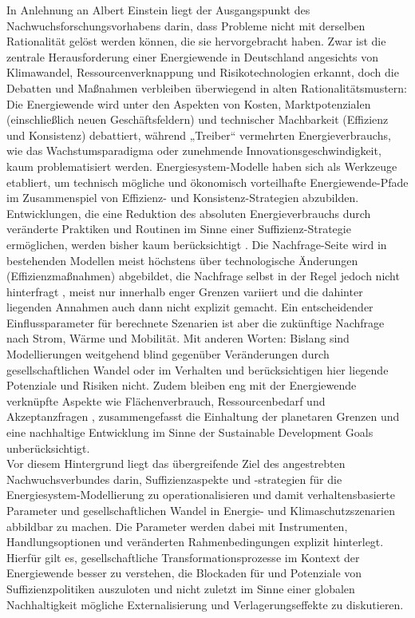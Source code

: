 \documentclass[a4paper,11pt,twoside]{scrartcl}
\begin{document}
In Anlehnung an Albert Einstein liegt der Ausgangspunkt des Nachwuchsforschungsvorhabens darin, dass Probleme nicht mit derselben Rationalität gelöst werden können, die sie hervorgebracht haben. Zwar ist die zentrale Herausforderung einer Energiewende in Deutschland angesichts von Klimawandel, Ressourcenverknappung und Risikotechnologien erkannt, doch die Debatten und Maßnahmen verbleiben überwiegend in alten Rationalitätsmustern: Die Energiewende wird unter den Aspekten von Kosten, Marktpotenzialen (einschließlich neuen Geschäftsfeldern) und technischer Machbarkeit (Effizienz und Konsistenz) debattiert, während „Treiber“ vermehrten Energieverbrauchs, wie das Wachstumsparadigma oder zunehmende Innovationsgeschwindigkeit, kaum problematisiert werden. Energiesystem-Modelle haben sich als Werkzeuge etabliert, um technisch mögliche und ökonomisch vorteilhafte Energiewende-Pfade im Zusammenspiel von Effizienz- und Konsistenz-Strategien abzubilden. Entwicklungen, die eine Reduktion des absoluten Energieverbrauchs durch veränderte Praktiken und Routinen im Sinne einer Suffizienz-Strategie ermöglichen, werden bisher kaum berücksichtigt \cite{SAMADI2017}. Die Nachfrage-Seite wird in bestehenden Modellen meist höchstens über technologische Änderungen (Effizienzmaßnahmen) abgebildet, die Nachfrage selbst in der Regel jedoch nicht hinterfragt \cite{Creutzig2018}, meist nur innerhalb enger Grenzen variiert und die dahinter liegenden Annahmen auch dann nicht explizit gemacht. Ein entscheidender Einflussparameter für berechnete Szenarien ist aber die zukünftige Nachfrage nach Strom, Wärme und Mobilität. Mit anderen Worten: Bislang sind Modellierungen weitgehend blind gegenüber Veränderungen durch gesellschaftlichen Wandel oder im Verhalten und berücksichtigen hier liegende Potenziale und Risiken nicht. Zudem bleiben eng mit der Energiewende verknüpfte Aspekte wie Flächenverbrauch, Ressourcenbedarf \cite{Mocker2015,Buchert2011} und Akzeptanzfragen \cite{Fuchs2016}, zusammengefasst die Einhaltung der planetaren Grenzen \cite{Rockstroem2009} und eine nachhaltige Entwicklung im Sinne der Sustainable Development Goals \cite{UN_SDG} unberücksichtigt.\\
Vor diesem Hintergrund liegt das übergreifende Ziel des angestrebten Nachwuchsverbundes darin, Suffizienzaspekte und -strategien für die Energiesystem-Modellierung zu operationalisieren und damit verhaltensbasierte Parameter und gesellschaftlichen Wandel in Energie- und Klimaschutzszenarien abbildbar zu machen. Die Parameter werden dabei mit Instrumenten, Handlungsoptionen und veränderten Rahmenbedingungen explizit hinterlegt. Hierfür gilt es, gesellschaftliche Transformationsprozesse im Kontext der Energiewende besser zu verstehen, die Blockaden für und Potenziale von Suffizienzpolitiken auszuloten und nicht zuletzt im Sinne einer globalen Nachhaltigkeit mögliche Externalisierung und Verlagerungseffekte zu diskutieren.
\end{document}

